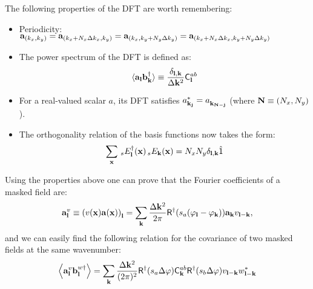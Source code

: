 \documentclass[a4paper,10pt]{article}
\begin{document}
    The following properties of the DFT are worth remembering:
    \begin{itemize}
     \item Periodicity: ${\bf a}_{(k_x,k_y)}={\bf a}_{(k_x+N_x\Delta k_x,k_y)}={\bf a}_{(k_x,k_y+N_y\Delta k_y)}={\bf a}_{(k_x+N_x\Delta k_x,k_y+N_y\Delta k_y)}$
     \item The power spectrum of the DFT is defined as:
           \begin{equation}
             \langle{\bf a}_{\bf l}{\bf b}^\dag_{\bf k}\rangle\equiv\frac{\delta_{{\bf l},{\bf k}}}{\Delta{\bf k}^2}{\sf C}^{ab}_{\bf l}
           \end{equation}
     \item For a real-valued scalar $a$, its DFT satisfies $a^*_{{\bf k}_{\bf j}}=a^{}_{{\bf k}_{{\bf N}-{\bf j}}}$ (where ${\bf N}\equiv(N_x,N_y)$).
     \item The orthogonality relation of the basis functions now takes the form:
           \begin{equation}
             \sum_{\bf x}\,_sE^\dag_{\bf l}({\bf x})\,_sE_{\bf k}({\bf x})=N_xN_y\delta_{{\bf l},{\bf k}}\hat{\sf 1}
           \end{equation}
    \end{itemize}

    Using the properties above one can prove that the Fourier coefficients of a masked field are:
    \begin{equation}
      {\bf a}^v_{\bf l}\equiv\left(v({\bf x}){\bf a}({\bf x})\right)_{\bf l}=\sum_{\bf k}\frac{\Delta{\bf k}^2}{2\pi}{\sf R}^\dag(s_a(\varphi_{\bf l}-\varphi_{\bf k})){\bf a}_{\bf k}v_{{\bf l}-{\bf k}},
    \end{equation}
    and we can easily find the following relation for the covariance of two masked fields at the same wavenumber:
    \begin{equation}
      \left\langle{\bf a}^v_{\bf l}{\bf b}^{w\dag}_{\bf l}\right\rangle=\sum_{\bf k}\frac{\Delta{\bf k}^2}{(2\pi)^2}{\sf R}^\dag(s_a\Delta\varphi){\sf C}^{ab}_{\bf k}{\sf R}^\dag(s_b\Delta\varphi)v_{{\bf l}-{\bf k}}w^*_{{\bf l}-{\bf k}}
    \end{equation}
    
\end{document}

